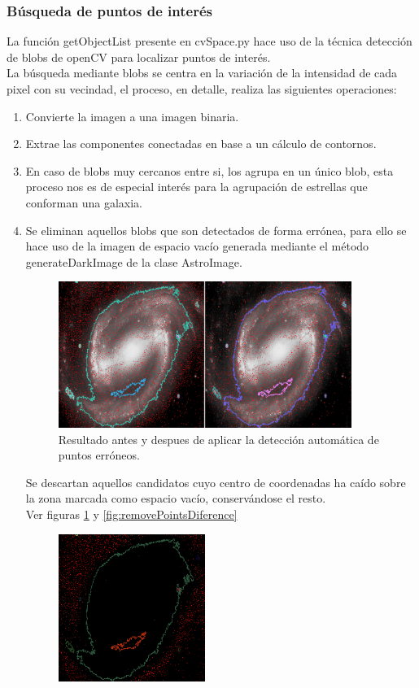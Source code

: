	\subsubsection{Búsqueda de puntos de interés}
	La función getObjectList presente en cvSpace.py hace uso de la técnica detección de blobs de openCV para localizar puntos de interés.\\
	La búsqueda mediante blobs se centra en la variación de la intensidad de cada pixel con su vecindad, el proceso, en detalle, realiza las siguientes operaciones:
	\begin{enumerate}
		\item Convierte la imagen a una imagen binaria.
		\item Extrae las componentes conectadas en base a un cálculo de contornos.
		\item En caso de blobs muy cercanos entre si, los agrupa en un único blob, esta proceso nos es de especial interés para la agrupación de estrellas que conforman una galaxia.
		\item Se eliminan aquellos blobs que son detectados de forma errónea, para ello se hace uso de la imagen de espacio vacío generada mediante el método {\large generateDarkImage} de la clase AstroImage.\\
			\begin{figure}[!htb]
				\centering
				\includegraphics[width=0.9\textwidth]{images/removeBadPointsComparation.PNG}
				\caption{\label{fig:removePointsConparation}Resultado antes y despues de aplicar la detección automática de puntos erróneos.}
			\end{figure}
		Se descartan aquellos candidatos cuyo centro de coordenadas ha caído sobre la zona marcada como espacio vacío, conservándose el resto.\\ Ver figuras  \ref{fig:removePointsConparation} y \ref{fig:removePointsDiference}
			\begin{figure}[!htb]
				\centering
				\includegraphics[width=0.45\textwidth]{images/removeBadPointsDiference.PNG}

\end{figure}
\end{enumerate}
